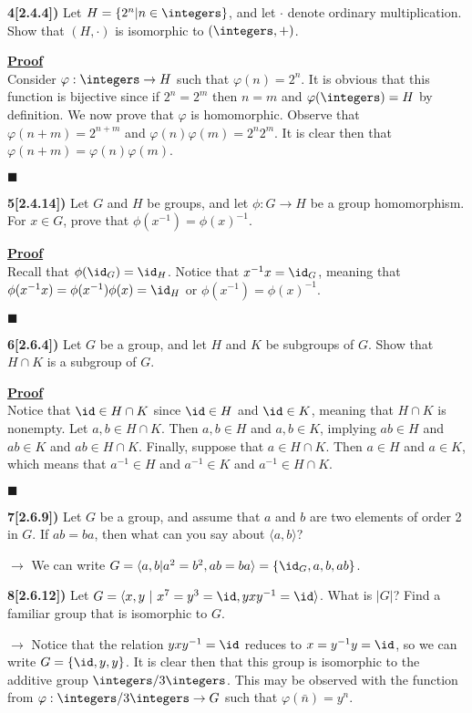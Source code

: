 \documentclass[12pt,a4paper]{article}
\newcommand{\prob}[2]{\textbf{#1)} #2}
\newenvironment{proof}
{
\textbf{\underline{Proof}} \\
}
{
\begin{flushright}
$\blacksquare$
\end{flushright}}
\begin{document}
\prob{4[2.4.4]}{Let $H = \{2^{n}|n\in\integers\}$, and let $\cdot$ denote ordinary multiplication. Show that $(H,\cdot)$ is isomorphic to $(\integers,+)$.}

\begin{proof}
Consider $\varphi: \integers \rightarrow H$ such that $\varphi(n) = 2^n$. It is obvious that this function is bijective since if $2^n = 2^m$ then $n=m$ and $\varphi(\integers) = H$ by definition. We now prove that $\varphi$ is homomorphic. Observe that $\varphi(n+m) = 2^{n+m}$ and $\varphi(n)\varphi(m) = 2^n2^m$. It is clear then that $\varphi(n+m) = \varphi(n)\varphi(m)$.
\end{proof}

\prob{5[2.4.14]}{Let $G$ and $H$ be groups, and let $\phi: G \rightarrow H$ be a group homomorphism. For $x \in G$, prove that $\phi(x^{-1}) = \phi(x)^{-1}$.}

\begin{proof}
Recall that $\phi(\id_G) = \id_H$. Notice that $x^{-1}x = \id_G$, meaning that $\phi(x^{-1}x) = \phi(x^{-1})\phi(x) = \id_H$ or $\phi(x^{-1}) = \phi(x)^{-1}$.
\end{proof}

\prob{6[2.6.4]}{Let $G$ be a group, and let $H$ and $K$ be subgroups of $G$. Show that $H \cap K$ is a subgroup of $G$.}

\begin{proof}
Notice that $\id \in H \cap K$ since $\id \in H$ and $\id \in K$, meaning that $H \cap K$ is nonempty. Let $a,b \in H \cap K$. Then $a,b \in H$ and $a,b \in K$, implying $ab \in H$ and $ab \in K$ and $ab \in H \cap K$. Finally, suppose that $a \in H \cap K$. Then $a \in H$ and $a \in K$, which means that $a^{-1} \in H$ and $a^{-1} \in K$ and $a^{-1} \in H \cap K$.
\end{proof}

\prob{7[2.6.9]}{Let $G$ be a group, and assume that $a$ and $b$ are two elements of order 2 in $G$. If $ab = ba$, then what can you say about $\langle a,b \rangle$?}

$\rightarrow$ We can write $G = \langle a,b | a^2=b^2, ab = ba \rangle = \{\id_G,a,b,ab\}$.

\prob{8[2.6.12]}{Let $G = \langle x,y ~|~ x^{7}=y^{3}=\id,yxy^{-1}=\id \rangle$. What is $|G|$? Find a familiar group that is isomorphic to $G$.}

$\rightarrow$ Notice that the relation $yxy^{-1} = \id$ reduces to $x = y^{-1}y = \id$, so we can write $G = \{\id,y,y\}$. It is clear then that this group is isomorphic to the additive group $\integers/3\integers$. This may be observed with the function from $\varphi: \integers/3\integers \rightarrow G$ such that $\varphi(\bar{n}) = y^{n}$.
\end{document}
